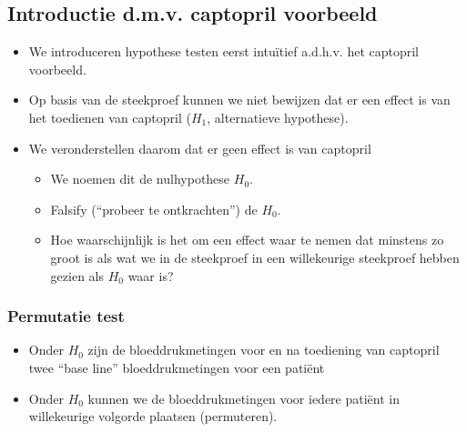 \documentclass[
  12pt,dutch]{book}
\theoremstyle{definition}
\theoremstyle{definition}
\theoremstyle{definition}
\theoremstyle{definition}
\theoremstyle{remark}
\begin{document}
\subsection{Introductie d.m.v. captopril voorbeeld}\label{introductie-d.m.v.-captopril-voorbeeld}

\begin{itemize}
\item
  We introduceren hypothese testen eerst intuïtief a.d.h.v. het captopril voorbeeld.
\item
  Op basis van de steekproef kunnen we niet bewijzen dat er een effect is van het toedienen van captopril (\(H_1\), alternatieve hypothese).
\item
  We veronderstellen daarom dat er geen effect is van captopril

  \begin{itemize}
  \item
    We noemen dit de nulhypothese \(H_0\).
  \item
    Falsify (``probeer te ontkrachten'') de \(H_0\).
  \item
    Hoe waarschijnlijk is het om een effect waar te nemen dat minstens zo groot is als wat we in de steekproef in een willekeurige steekproef hebben gezien als \(H_0\) waar is?
  \end{itemize}
\end{itemize}

\subsubsection{Permutatie test}\label{permutatie-test}

\begin{itemize}
\item
  Onder \(H_0\) zijn de bloeddrukmetingen voor en na toediening van captopril twee ``base line'' bloeddrukmetingen voor een patiënt
\item
  Onder \(H_0\) kunnen we de bloeddrukmetingen voor iedere patiënt in willekeurige volgorde plaatsen (permuteren).
\end{itemize}
\end{document}
